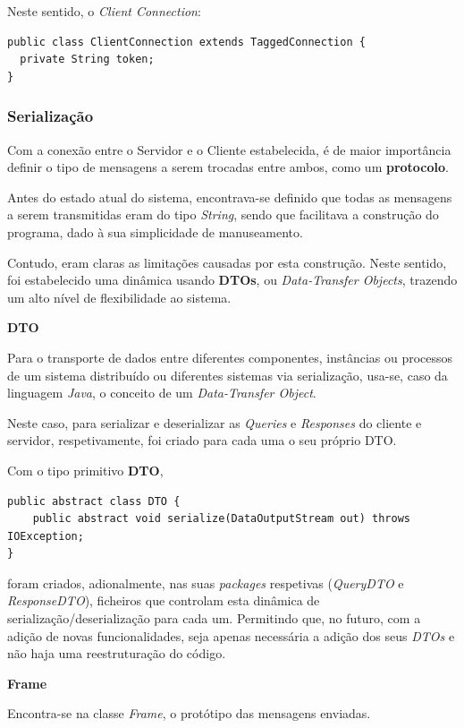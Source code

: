 \documentclass[relatorio.tex]{subfiles}
\begin{document}
Neste sentido, o \textit{Client Connection}:
\begin{verbatim}
public class ClientConnection extends TaggedConnection {
  private String token;
}
\end{verbatim}

\subsubsection{Serialização}
Com a conexão entre o Servidor e o Cliente estabelecida, é de maior importância definir o tipo 
de mensagens a serem trocadas entre ambos, como um \textbf{protocolo}.

Antes do estado atual do sistema, encontrava-se definido que todas as mensagens a serem transmitidas
eram do tipo \textit{String}, sendo que facilitava a construção do programa, dado à sua simplicidade
de manuseamento.

Contudo, eram claras as limitações causadas por esta construção. Neste sentido, foi estabelecido uma 
dinâmica usando \textbf{DTOs}, ou \textit{Data-Transfer Objects}, trazendo um alto nível de flexibilidade
ao sistema.

\rightarrow \textbf{DTO}

Para o transporte de dados entre diferentes componentes, instâncias ou processos 
de um sistema distribuído ou diferentes sistemas via serialização, usa-se, caso da linguagem \textit{Java},
o conceito de um \textit{Data-Transfer Object}.

Neste caso, para serializar e deserializar as \textit{Queries} e \textit{Responses} do cliente e servidor, 
respetivamente, foi criado para cada uma o seu próprio DTO. 

Com o tipo primitivo \textbf{DTO},

\begin{verbatim}
public abstract class DTO {    
    public abstract void serialize(DataOutputStream out) throws IOException;
}
\end{verbatim}

foram criados, adionalmente, nas suas \textit{packages} respetivas (\textit{QueryDTO} e \textit{ResponseDTO}),
ficheiros que controlam esta dinâmica de serialização/deserialização para cada um.
Permitindo que, no futuro, com a adição de novas funcionalidades, seja apenas necessária a adição dos seus 
\textit{DTOs} e não haja uma reestruturação do código.

\rightarrow \textbf{Frame}

Encontra-se na classe \textit{Frame}, o protótipo das mensagens enviadas.
\end{document}
